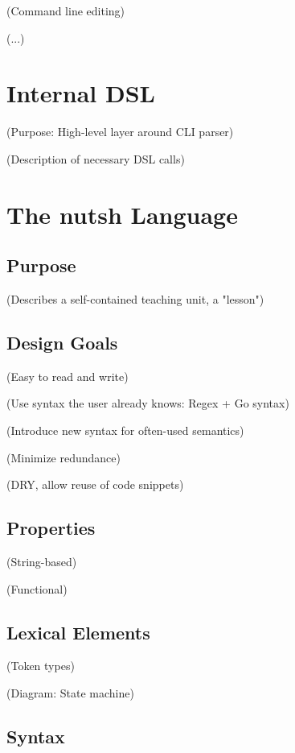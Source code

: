 \documentclass[twoside]{scrreprt}
\begin{document}
                (Command line editing)

                (...)

\section{Internal DSL}

            (Purpose: High-level layer around CLI parser)

            (Description of necessary DSL calls)

\section{The nutsh Language}

\subsection{Purpose}

                (Describes a self-contained teaching unit, a "lesson")

\subsection{Design Goals}

                (Easy to read and write)

                    (Use syntax the user already knows: Regex + Go syntax)

                    (Introduce new syntax for often-used semantics)

                (Minimize redundance)

                    (DRY, allow reuse of code snippets)

\subsection{Properties}

                (String-based)

                (Functional)

\subsection{Lexical Elements}

                (Token types)

                (Diagram: State machine)

\subsection{Syntax}
\end{document}
